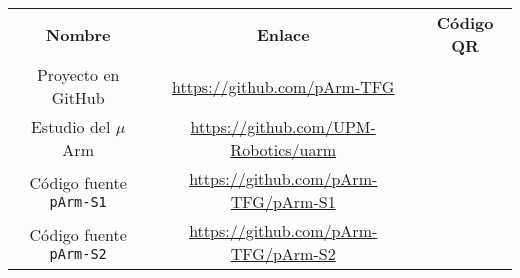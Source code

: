 \begin{longtable}{ C{0.5} C{0.5} C{0.5} }
    \hline
    \textbf{Nombre} & \textbf{Enlace} & \textbf{Código QR} \\[2ex]
    Proyecto en GitHub & \url{https://github.com/pArm-TFG} &  \\[7ex]
    Estudio del $\mu$Arm & \url{https://github.com/UPM-Robotics/uarm} &  \\[7ex]
    Código fuente \texttt{pArm-S1} & \url{https://github.com/pArm-TFG/pArm-S1} &  \\[7ex]
    Código fuente \texttt{pArm-S2} & \url{https://github.com/pArm-TFG/pArm-S2} &  \\[7ex]
    \hline
\end{longtable}